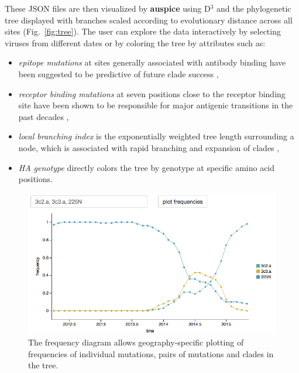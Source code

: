 \documentclass{bioinfo}
\newcommand{\FIG}[1]{Fig.~\ref{fig:#1}}
\newcommand{\auspice}{\textbf{auspice}}
\begin{document}
These JSON files are then visualized by \auspice{} using D$^3$ \citep{bostock_d3_2011} and the phylogenetic tree displayed with branches scaled according to evolutionary distance across all sites (\FIG{tree}).
The user can explore the data interactively by selecting viruses from different dates or by coloring the tree by attributes such as:
\begin{itemize}
	\item \textit{epitope mutations} at sites generally associated with antibody binding have been suggested to be predictive of future clade success \citep{luksza_predictive_2014},
    \item \textit{receptor binding mutations} at seven positions close to the receptor binding site have been shown to be responsible for major antigenic transitions in the past decades \citep{koel_substitutions_2013},
    \item \textit{local branching index} is the exponentially weighted tree length surrounding a node, which is associated with rapid branching and expansion of clades \citep{neher_predicting_2014},
    \item \textit{HA genotype} directly colors the tree by genotype at specific amino acid positions.
\end{itemize}

\begin{figure}[t]
	\centering
	\includegraphics[width=0.99\columnwidth]{frequencies}
	\caption[]{The frequency diagram allows geography-specific plotting of frequencies of individual mutations, pairs of mutations and clades in the tree.}
	\label{fig:freq}
\end{figure}
\end{document}

